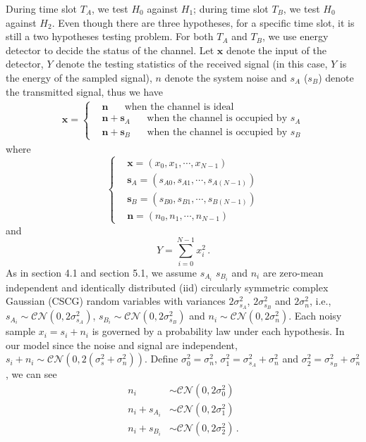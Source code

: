 During time slot $T_A$, we  test $H_0$ against $H_1$; during time slot $T_B$, we test $H_0$ against $H_2$. 
Even though there are three hypotheses, for a specific time slot, it is still a two hypotheses testing problem.  
For both $T_A$ and $T_B$, we use energy detector to decide the status of the channel. Let $\mathbf{x}$ denote the input of the detector, $Y$ denote the testing statistics of the received signal (in this case, $Y$ is the energy of the sampled signal), $n$  denote the system noise and $s_A$ ($s_B$) denote the transmitted signal, thus we have
\begin{eqnarray}
  \mathbf{x} = \begin{cases}
    &\mathbf{n}\;\;\;\;\;\;\text{when the channel is ideal}\\
    &\mathbf{n} + \mathbf{s}_A \;\;\;\;\;\;\text{when the channel is occupied by $s_A$}\\
    &\mathbf{n} + \mathbf{s}_B \;\;\;\;\;\;\text{when the channel is occupied by $s_B$}
  \end{cases}
  \label{20150627a0}
\end{eqnarray}
where
\begin{equation}
  \begin{cases}
  &\mathbf{x} = (x_0, x_1, \cdots, x_{N-1})\\
  &\mathbf{s}_A = (s_{A0}, s_{A1}, \cdots, s_{A(N-1)})\\
  &\mathbf{s}_B = (s_{B0}, s_{B1}, \cdots, s_{B(N-1)})\\
  &\mathbf{n} = (n_{0}, n_{1}, \cdots, n_{N-1})
  \end{cases}
  \label{20150627a1}
\end{equation}
and
\begin{equation}
Y = \sum_{i=0}^{N-1} x_i^2\,.
\end{equation}
As in section 4.1 and section 5.1, we assume  $s_{A_i}$ $s_{B_i}$ and $n_i$ are zero-mean independent and identically distributed (iid) circularly symmetric complex Gaussian (CSCG) random variables with variances $2\sigma_{s_A}^2$, $2\sigma_{s_B}^2$ and $2\sigma_{n}^2$, i.e., $s_{A_i} \sim \mathcal{CN}(0, 2\sigma_{s_A}^2)$, $s_{B_i} \sim \mathcal{CN}(0, 2\sigma_{s_B}^2)$ and $n_i \sim \mathcal{CN}(0, 2\sigma_{n}^2)$.
Each noisy sample $x_i = s_i + n_i$ is governed by a probability law under each hypothesis. In our model
since the noise and signal are independent, $s_i+ n_i \sim \mathcal{CN}(0, 2(\sigma_{s}^2 + \sigma_n^2))$.  Define $\sigma_0^2 = \sigma_n^2$, $\sigma_1^2 = \sigma_{s_A}^2 + \sigma_n^2$ and $\sigma_2^2 = \sigma_{s_B}^2 + \sigma_n^2$, we can see
\begin{equation}
  \label{20150627a2}
  \begin{split}
  n_i &\sim \mathcal{CN}(0, 2\sigma_0^2)\\
  n_i + s_{A_i} &\sim \mathcal{CN}(0, 2\sigma_1^2)\\
   n_i + s_{B_i}&\sim \mathcal{CN}(0, 2\sigma_2^2) \,.
  \end{split}
\end{equation}

